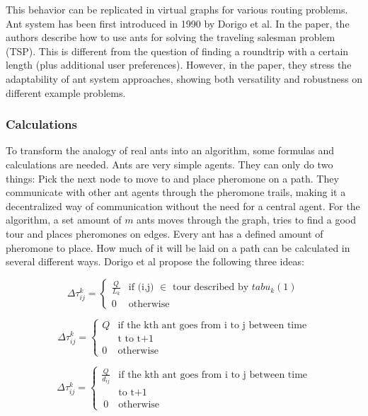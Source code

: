 This behavior can be replicated in virtual graphs for various routing problems.
Ant system has been first introduced in 1990 by Dorigo et al\cite{dorigo_ant_1996}.
In the paper, the authors describe how to use ants for solving the traveling salesman problem (TSP).
This is different from the question of finding a roundtrip with a certain length (plus additional user preferences).
However, in the paper, they stress the adaptability of ant system approaches, showing both versatility and robustness on different example problems\cite{dorigo_ant_1996}.


\subsubsection{Calculations}

To transform the analogy of real ants into an algorithm, some formulas and calculations are needed.
Ants are very simple agents. 
They can only do two things:
Pick the next node to move to and place pheromone on a path.
They communicate with other ant agents through the pheromone trails, making it a decentralized way of communication without the need for a central agent.
For the algorithm, a set amount of $m$ ants moves through the graph, tries to find a good tour and places pheromones on edges.
Every ant has a defined amount of pheromone to place. 
How much of it will be laid on a path can be calculated in several different ways. 
Dorigo et al propose the following three ideas\cite{dorigo_ant_1996}:

\begin{equation}\label{eq:antCycle}
	\Delta\tau_{ij}^k = \begin{cases}
			\frac{Q}{L_k} &\text{if (i,j) $\in$ tour described by $tabu_k(1)$} \\
			0 &\text{otherwise}
	\end{cases}	
\end{equation}


\begin{equation}\label{eq:antDensity}
	\Delta\tau_{ij}^k = \begin{cases}
	Q &\text{if the kth ant goes from i to j between time} \\
	&\text{t to t+1} \\
	0 &\text{otherwise}
\end{cases}	
\end{equation}


\begin{equation}\label{eq:antQuantity}
	\Delta\tau_{ij}^k = \begin{cases}
	\frac{Q}{d_{ij}} &\text{if the kth ant goes from i to j between time} \\
		&\text{to t+1} \\\
	0 &\text{otherwise}
\end{cases}	
\end{equation}


